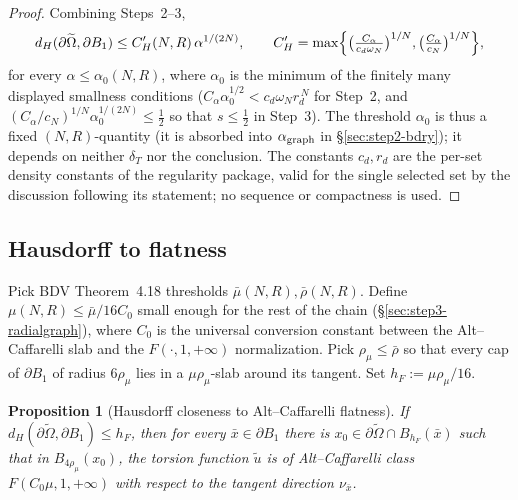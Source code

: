 \documentclass[11pt]{amsart}
\newtheorem{proposition}[theorem]{Proposition}
\theoremstyle{definition}
\begin{document}
\begin{proof}
Combining Steps~2--3,
\[
d_H(\partial\widetilde\Omega,\partial B_1)\le C_H'(N,R)\,\alpha^{1/(2N)},
\qquad
C_H'=\max\Bigl\{\bigl(\tfrac{C_\alpha}{c_d\omega_N}\bigr)^{1/N},
\bigl(\tfrac{C_\alpha}{c_N}\bigr)^{1/N}\Bigr\},
\]
for every $\alpha\le\alpha_0(N,R)$, where $\alpha_0$ is the minimum of the
finitely many displayed smallness conditions
($C_\alpha\alpha_0^{1/2}<c_d\omega_N r_d^{\,N}$ for Step~2, and
$(C_\alpha/c_N)^{1/N}\alpha_0^{1/(2N)}\le\tfrac12$ so that $s\le\tfrac12$ in
Step~3). The threshold $\alpha_0$ is thus a fixed $(N,R)$-quantity (it is
absorbed into $\alpha_{\rm graph}$ in \S\ref{sec:step2-bdry}); it depends on
neither $\delta_T$ nor the conclusion.
The constants $c_d,r_d$ are the per-set density constants of the regularity
package, valid for the single selected set by the discussion following its
statement; no sequence or compactness is used.
\end{proof}

\subsection{Hausdorff to flatness}

Pick BDV Theorem~4.18 thresholds $\bar\mu(N,R),\bar\rho(N,R)$. Define
$\mu(N,R)\le\bar\mu/16C_0$ small enough for the rest of the chain
(\S\ref{sec:step3-radialgraph}), where $C_0$ is the universal conversion constant
between the Alt--Caffarelli slab and the $F(\cdot,1,+\infty)$ normalization.
Pick $\rho_\mu\le\bar\rho$ so that every cap of $\partial B_1$ of radius
$6\rho_\mu$ lies in a $\mu\rho_\mu$-slab around its tangent. Set
$h_F:=\mu\rho_\mu/16$.

\begin{proposition}[Hausdorff closeness to Alt--Caffarelli flatness]\label{prop:flatness}
If $d_H(\partial\widetilde\Omega,\partial B_1)\le h_F$, then for every
$\bar x\in\partial B_1$ there is $x_0\in\partial\widetilde\Omega\cap B_{h_F}(\bar x)$
such that in $B_{4\rho_\mu}(x_0)$, the torsion function $\widetilde u$ is of
Alt--Caffarelli class $F(C_0\mu,1,+\infty)$ with respect to the tangent
direction $\nu_{\bar x}$.
\end{proposition}
\end{document}

